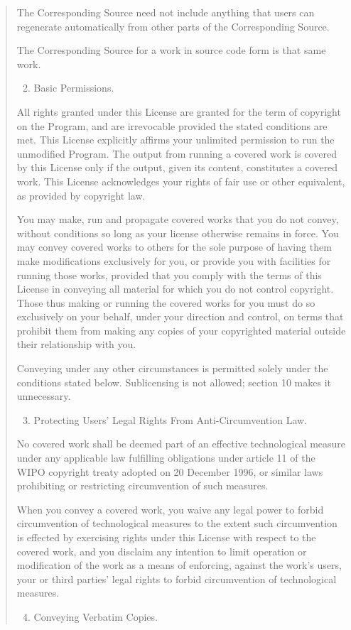 \documentclass[letterpaper,10pt,english]{sphinxmanual}
\begin{document}
\begin{quote}
The Corresponding Source need not include anything that users
can regenerate automatically from other parts of the Corresponding
Source.

The Corresponding Source for a work in source code form is that
same work.
\begin{enumerate}
\setcounter{enumi}{1}
\item {} 
Basic Permissions.

\end{enumerate}

All rights granted under this License are granted for the term of
copyright on the Program, and are irrevocable provided the stated
conditions are met.  This License explicitly affirms your unlimited
permission to run the unmodified Program.  The output from running a
covered work is covered by this License only if the output, given its
content, constitutes a covered work.  This License acknowledges your
rights of fair use or other equivalent, as provided by copyright law.

You may make, run and propagate covered works that you do not
convey, without conditions so long as your license otherwise remains
in force.  You may convey covered works to others for the sole purpose
of having them make modifications exclusively for you, or provide you
with facilities for running those works, provided that you comply with
the terms of this License in conveying all material for which you do
not control copyright.  Those thus making or running the covered works
for you must do so exclusively on your behalf, under your direction
and control, on terms that prohibit them from making any copies of
your copyrighted material outside their relationship with you.

Conveying under any other circumstances is permitted solely under
the conditions stated below.  Sublicensing is not allowed; section 10
makes it unnecessary.
\begin{enumerate}
\setcounter{enumi}{2}
\item {} 
Protecting Users' Legal Rights From Anti-Circumvention Law.

\end{enumerate}

No covered work shall be deemed part of an effective technological
measure under any applicable law fulfilling obligations under article
11 of the WIPO copyright treaty adopted on 20 December 1996, or
similar laws prohibiting or restricting circumvention of such
measures.

When you convey a covered work, you waive any legal power to forbid
circumvention of technological measures to the extent such circumvention
is effected by exercising rights under this License with respect to
the covered work, and you disclaim any intention to limit operation or
modification of the work as a means of enforcing, against the work's
users, your or third parties' legal rights to forbid circumvention of
technological measures.
\begin{enumerate}
\setcounter{enumi}{3}
\item {} 
Conveying Verbatim Copies.


\end{enumerate}
\end{quote}
\end{document}
